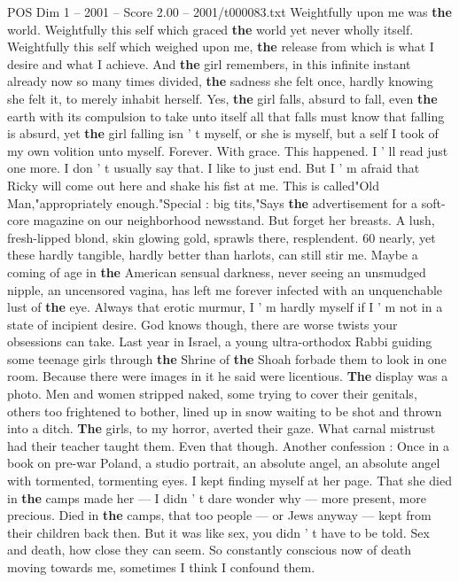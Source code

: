 \begin{textsample}{POS Dim 1 – 2001 – Score 2.00 – 2001/t000083.txt}
Weightfully upon me was \textbf{the} world.
Weightfully this self which graced \textbf{the} world yet never wholly itself.
Weightfully this self which weighed upon me, \textbf{the} release from which is what I desire and what I achieve.
And \textbf{the} girl remembers, in this infinite instant already now so many times divided, \textbf{the} sadness she felt once, hardly knowing she felt it, to merely inhabit herself.
Yes, \textbf{the} girl falls, absurd to fall, even \textbf{the} earth with its compulsion to take unto itself all that falls must know that falling is absurd, yet \textbf{the} girl falling isn ' t myself, or she is myself, but a self I took of my own volition unto myself.
Forever.
With grace.
This happened.
I ' ll read just one more.
I don ' t usually say that.
I like to just end.
But I ' m afraid that Ricky will come out here and shake his fist at me.
This is called"Old Man,"appropriately enough."Special : big tits,"Says \textbf{the} advertisement for a soft-core magazine on our neighborhood newsstand.
But forget her breasts.
A lush, fresh-lipped blond, skin glowing gold, sprawls there, resplendent. 60 nearly, yet these hardly tangible, hardly better than harlots, can still stir me.
Maybe a coming of age in \textbf{the} American sensual darkness, never seeing an unsmudged nipple, an uncensored vagina, has left me forever infected with an unquenchable lust of \textbf{the} eye.
Always that erotic murmur, I ' m hardly myself if I ' m not in a state of incipient desire.
God knows though, there are worse twists your obsessions can take.
Last year in Israel, a young ultra-orthodox Rabbi guiding some teenage girls through \textbf{the} Shrine of \textbf{the} Shoah forbade them to look in one room.
Because there were images in it he said were licentious. \textbf{The} display was a photo.
Men and women stripped naked, some trying to cover their genitals, others too frightened to bother, lined up in snow waiting to be shot and thrown into a ditch. \textbf{The} girls, to my horror, averted their gaze.
What carnal mistrust had their teacher taught them.
Even that though.
Another confession : Once in a book on pre-war Poland, a studio portrait, an absolute angel, an absolute angel with tormented, tormenting eyes.
I kept finding myself at her page.
That she died in \textbf{the} camps made her — I didn ' t dare wonder why — more present, more precious.
Died in \textbf{the} camps, that too people — or Jews anyway — kept from their children back then.
But it was like sex, you didn ' t have to be told.
Sex and death, how close they can seem.
So constantly conscious now of death moving towards me, sometimes I think I confound them.

\end{textsample}
